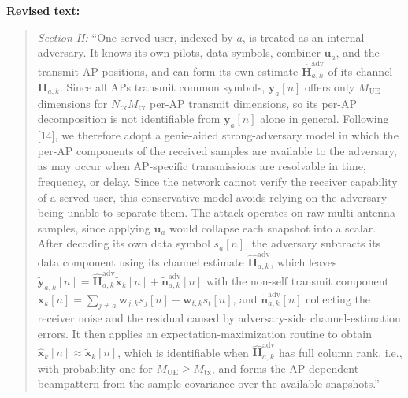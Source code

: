 \documentclass[a4paper,12pt]{article}
\newenvironment{revisedtext}{%
  \par\textbf{Revised text:}\begin{quote}\color{red}
}{\end{quote}}
\begin{document}
\begin{revisedtext}
\textit{Section II:} ``One served user, indexed by $a$, is treated as an
internal adversary. It knows its own pilots, data symbols, combiner
$\mathbf{u}_a$, and the transmit-AP positions, and can form its own estimate
$\widehat{\mathbf{H}}_{a,k}^{\mathrm{adv}}$ of its channel
$\mathbf{H}_{a,k}$. Since all APs transmit common symbols, $\mathbf{y}_a[n]$
offers only $M_{\mathrm{UE}}$ dimensions for $N_{\mathrm{tx}}M_{\mathrm{tx}}$
per-AP transmit dimensions, so its per-AP decomposition is not identifiable
from $\mathbf{y}_a[n]$ alone in general. Following [14], we therefore adopt a
genie-aided strong-adversary model in which the per-AP components of the
received samples are available to the adversary, as may occur when
AP-specific transmissions are resolvable in time, frequency, or delay. Since
the network cannot verify the receiver capability of a served user, this
conservative model avoids relying on the adversary being unable to separate
them. The attack operates on raw multi-antenna samples, since applying
$\mathbf{u}_a$ would collapse each snapshot into a scalar. After decoding its
own data symbol $s_a[n]$, the adversary subtracts its data component using
its channel estimate $\widehat{\mathbf{H}}_{a,k}^{\mathrm{adv}}$, which
leaves
$\widetilde{\mathbf{y}}_{a,k}[n]=\widehat{\mathbf{H}}_{a,k}^{\mathrm{adv}}\widetilde{\mathbf{x}}_k[n]+\widetilde{\mathbf{n}}_{a,k}^{\mathrm{adv}}[n]$
with the non-self transmit component
$\widetilde{\mathbf{x}}_k[n]=\sum_{j\neq a}\mathbf{w}_{j,k}s_j[n]+\mathbf{w}_{t,k}s_t[n]$,
and $\widetilde{\mathbf{n}}_{a,k}^{\mathrm{adv}}[n]$ collecting the receiver
noise and the residual caused by adversary-side channel-estimation errors.
It then applies an expectation-maximization routine to obtain
$\widehat{\mathbf{x}}_k[n]\approx\widetilde{\mathbf{x}}_k[n]$, which is
identifiable when $\widehat{\mathbf{H}}_{a,k}^{\mathrm{adv}}$ has full
column rank, i.e., with probability one for $M_{\mathrm{UE}}\ge
M_{\mathrm{tx}}$, and forms the AP-dependent beampattern from the sample
covariance over the available snapshots.''
\end{revisedtext}
\end{document}
